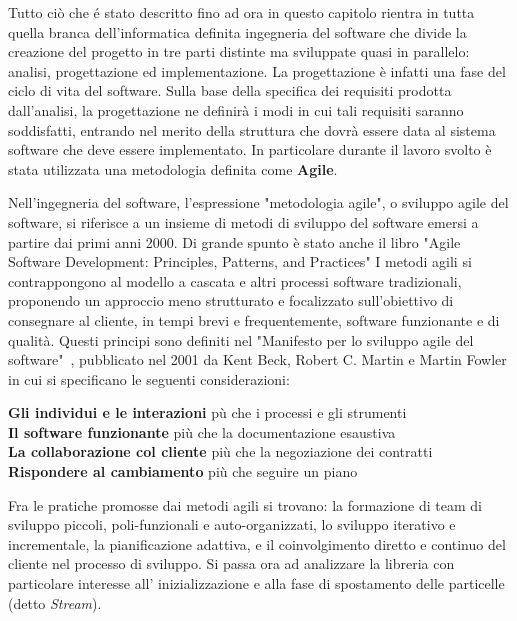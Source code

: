 Tutto ci\`o che \'e stato descritto fino ad ora in questo capitolo rientra in tutta quella branca dell'informatica definita ingegneria del software che divide la creazione del progetto in tre parti distinte ma sviluppate quasi in parallelo: analisi, progettazione ed implementazione. La progettazione \`e infatti una fase del ciclo di vita del software. Sulla base della specifica dei requisiti prodotta dall'analisi, la progettazione ne definir\`a i modi in cui tali requisiti saranno soddisfatti, entrando nel merito della struttura che dovr\`a essere data al sistema software che deve essere implementato. In particolare durante il lavoro svolto \`e stata utilizzata una metodologia definita come \textbf{Agile}.


Nell'ingegneria del software, l'espressione "metodologia agile", o sviluppo agile del software, si riferisce a un insieme di metodi di sviluppo del software emersi a partire dai primi anni 2000. Di grande spunto \`e stato anche il libro "Agile Software Development: Principles, Patterns, and Practices"\cite{AG:02} I metodi agili si contrappongono al modello a cascata e altri processi software tradizionali, proponendo un approccio meno strutturato e focalizzato sull'obiettivo di consegnare al cliente, in tempi brevi e frequentemente, software funzionante e di qualit\`a.
Questi principi sono definiti nel "Manifesto per lo sviluppo agile del software"~\cite{agile2001},
pubblicato nel 2001 da Kent Beck, Robert C. Martin e Martin Fowler in cui si specificano le seguenti considerazioni:\\
\begin{center}
	\textbf{Gli individui e le interazioni} p\`u che i processi e gli strumenti\\
	\textbf{Il software funzionante} pi\`u che la documentazione esaustiva\\
	\textbf{La collaborazione col cliente} pi\`u che la negoziazione dei contratti\\
	\textbf{Rispondere al cambiamento} pi\`u che seguire un piano\\
\end{center}

Fra le pratiche promosse dai metodi agili si trovano: la formazione di team di sviluppo piccoli, poli-funzionali e auto-organizzati, lo sviluppo iterativo e incrementale, la pianificazione adattiva, e il coinvolgimento diretto e continuo del cliente nel processo di sviluppo. 
Si passa ora ad analizzare la libreria con particolare interesse all' inizializzazione e alla fase di spostamento delle particelle (detto \textit{Stream}).